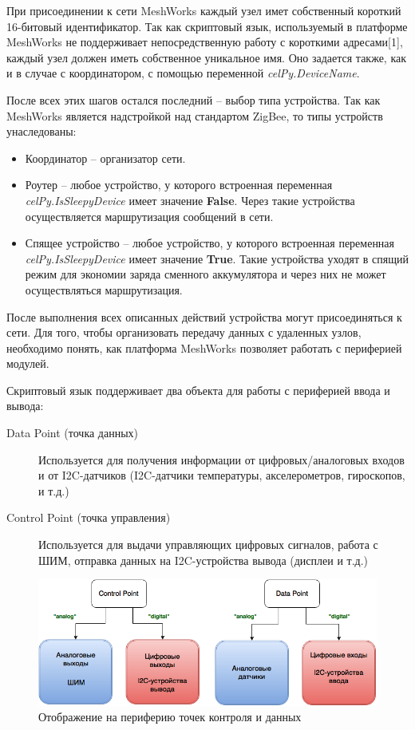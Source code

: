 \documentclass[11pt]{article}
\begin{document}
При присоединении к сети MeshWorks каждый узел имет собственный короткий 16-битовый
идентификатор. Так как скриптовый язык, используемый в платформе MeshWorks не поддерживает
непосредственную работу с короткими адресами[1], каждый узел должен иметь собственное
уникальное имя. Оно задается также, как и в случае с координатором, с помощью переменной
\emph{celPy.DeviceName}.

После всех этих шагов остался последний -- выбор типа устройства. Так как MeshWorks 
является надстройкой над стандартом ZigBee, то типы устройств унаследованы:
\begin{itemize}
    \item Координатор -- организатор сети.
    \item Роутер -- любое устройство, у которого встроенная переменная 
    \emph{celPy.IsSleepyDevice} имеет значение \textbf{False}. Через такие устройства
    осуществляется маршрутизация сообщений в сети.
    \item Спящее устройство -- любое устройство, у которого встроенная переменная 
    \emph{celPy.IsSleepyDevice} имеет значение \textbf{True}. Такие устройства уходят
    в спящий режим для экономии заряда сменного аккумулятора и через них не может
    осуществляться маршрутизация.
\end{itemize}

После выполнения всех описанных действий устройства могут присоединяться к сети. 
Для того, чтобы организовать передачу данных с удаленных узлов, необходимо понять, 
как платформа MeshWorks позволяет работать с периферией модулей.

Скриптовый язык поддерживает два объекта для работы с периферией ввода и вывода:

\begin{description}
    \item[Data Point (точка данных)] Используется для получения информации от 
    цифровых/аналоговых входов и от I2C-датчиков (I2C-датчики температуры, акселерометров,
    гироскопов, и т.д.)
    \item[Control Point (точка управления)] Используется для выдачи управляющих цифровых 
    сигналов, работа с ШИМ, отправка данных на I2C-устройства вывода (дисплеи и т.д.)
\end{description}

\begin{figure}[h!]
    \centering
    \includegraphics[scale=0.5]{DC_points.png}
    \caption{Отображение на периферию точек контроля и данных}
\end{figure}
\end{document}
